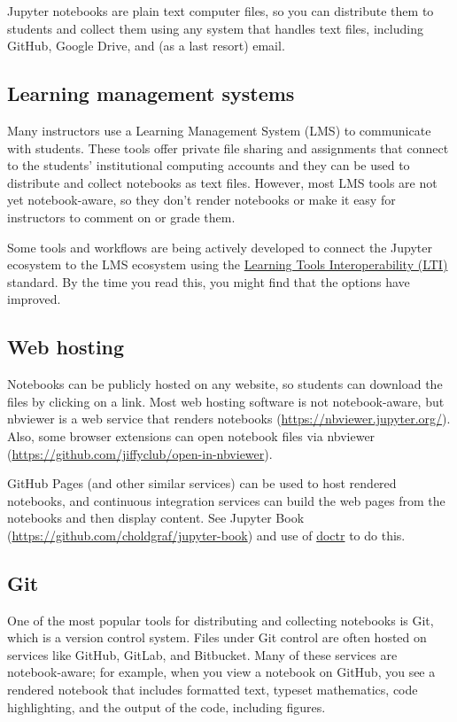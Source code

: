 \documentclass[]{book}
\begin{document}
Jupyter notebooks are plain text computer files, so you can distribute
them to students and collect them using any system that handles text
files, including GitHub, Google Drive, and (as a last resort) email.

\subsection{Learning management
systems}\label{learning-management-systems}

Many instructors use a Learning Management System (LMS) to communicate
with students. These tools offer private file sharing and assignments
that connect to the students' institutional computing accounts and they
can be used to distribute and collect notebooks as text files. However,
most LMS tools are not yet notebook-aware, so they don't render
notebooks or make it easy for instructors to comment on or grade them.

Some tools and workflows are being actively developed to connect the
Jupyter ecosystem to the LMS ecosystem using the
\href{https://open.edx.org/learning-tools-interoperability}{Learning
Tools Interoperability (LTI)} standard. By the time you read this, you
might find that the options have improved.

\subsection{Web hosting}\label{web-hosting}

Notebooks can be publicly hosted on any website, so students can
download the files by clicking on a link. Most web hosting software is
not notebook-aware, but nbviewer is a web service that renders notebooks
(\url{https://nbviewer.jupyter.org/}). Also, some browser extensions can
open notebook files via nbviewer
(\url{https://github.com/jiffyclub/open-in-nbviewer}).

GitHub Pages (and other similar services) can be used to host rendered
notebooks, and continuous integration services can build the web pages
from the notebooks and then display content. See Jupyter Book
(\url{https://github.com/choldgraf/jupyter-book}) and use of
\href{https://drdoctr.github.io/doctr}{doctr} to do this.

\subsection{Git}\label{git}

One of the most popular tools for distributing and collecting notebooks
is Git, which is a version control system. Files under Git control are
often hosted on services like GitHub, GitLab, and Bitbucket. Many of
these services are notebook-aware; for example, when you view a notebook
on GitHub, you see a rendered notebook that includes formatted text,
typeset mathematics, code highlighting, and the output of the code,
including figures.
\end{document}
